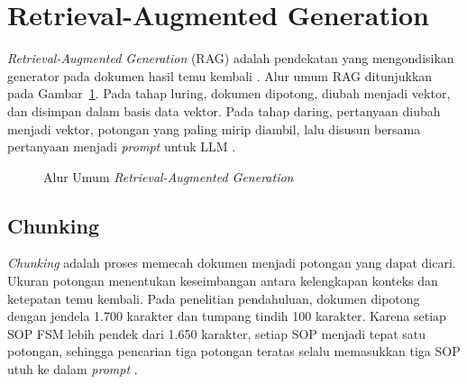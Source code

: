 \section{Retrieval-Augmented Generation}
\label{sec:rag}
\textit{Retrieval-Augmented Generation} (RAG) adalah pendekatan yang mengondisikan generator pada dokumen hasil temu kembali \parencite{lewis2020rag,church2024emerging}. Alur umum RAG ditunjukkan pada Gambar~\ref{fig:rag}. Pada tahap luring, dokumen dipotong, diubah menjadi vektor, dan disimpan dalam basis data vektor. Pada tahap daring, pertanyaan diubah menjadi vektor, potongan yang paling mirip diambil, lalu disusun bersama pertanyaan menjadi \textit{prompt} untuk LLM \parencite{gao2023ragsurvey}.

\begin{figure}[htbp]
\centering
{}
\caption{Alur Umum \textit{Retrieval-Augmented Generation}}
\label{fig:rag}
\end{figure}

\subsection{Chunking}
\textit{Chunking} adalah proses memecah dokumen menjadi potongan yang dapat dicari. Ukuran potongan menentukan keseimbangan antara kelengkapan konteks dan ketepatan temu kembali. Pada penelitian pendahuluan, dokumen dipotong dengan jendela 1.700 karakter dan tumpang tindih 100 karakter. Karena setiap SOP FSM lebih pendek dari 1.650 karakter, setiap SOP menjadi tepat satu potongan, sehingga pencarian tiga potongan teratas selalu memasukkan tiga SOP utuh ke dalam \textit{prompt} \parencite{wiratama2026procedure}.

